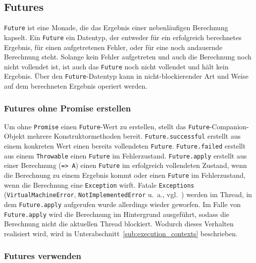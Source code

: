 \subsection{Futures} %
\label{sub:futures}

\lstinline|Future| ist eine Monade, die das Ergebnis einer nebenläufigen Berechnung kapselt.
Ein \lstinline|Future| ein Datentyp, der entweder für ein erfolgreich berechnetes Ergebnis, für einen aufgetretenen Fehler, oder für eine noch andauernde Berechnung steht.
Solange kein Fehler aufgetreten und auch die Berechnung noch nicht vollendet ist, ist auch das \lstinline|Future| noch nicht vollendet und hält kein Ergebnis.
Über den \lstinline|Future|-Datentyp kann in nicht-blockierender Art und Weise auf dem berechneten Ergebnis operiert werden.

\subsubsection{Futures ohne Promise erstellen} %
\label{ssub:futures_erstellen}

Um ohne \lstinline|Promise| einen \lstinline|Future|-Wert zu erstellen, stellt das \lstinline|Future|-Companion-Objekt mehrere Konstruktormethoden bereit.
\lstinline|Future.successful| erstellt aus einem konkreten Wert einen bereits vollendeten \lstinline|Future|.
\lstinline|Future.failed| erstellt aus einem \lstinline|Throwable| einen \lstinline|Future| im Fehlerzustand.
\lstinline|Future.apply| erstellt aus einer Berechnung (\lstinline|=> A|) einen \lstinline|Future| im erfolgreich vollendeten Zustand, wenn die Berechnung zu einem Ergebnis kommt oder einen \lstinline|Future| im Fehlerzustand, wenn die Berechnung eine \lstinline|Exception| wirft.
Fatale \lstinline|Exceptions| (\lstinline|VirtualMachineError|, \lstinline|NotImplementedError| u.~a., vgl.~\citealt{nonfatal_exceptions}) werden im Thread, in dem \lstinline|Future.apply| aufgerufen wurde allerdings wieder geworfen.
Im Falle von \lstinline|Future.apply| wird die Berechnung im Hintergrund ausgeführt, sodass die Berechnung nicht die aktuellen Thread blockiert.
Wodurch dieses Verhalten realisiert wird, wird in Unterabschnitt~\ref{sub:execution_contexts} beschrieben.


\subsubsection{Futures verwenden} %
\label{ssub:futures_verwenden}

